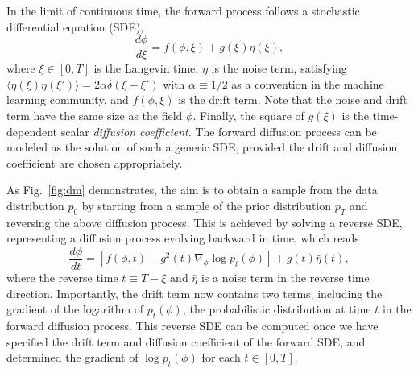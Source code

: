 In the limit of continuous time, the forward process follows a stochastic differential equation (SDE),
\begin{equation}
\frac{d \phi}{d\xi } = f(\phi, \xi) + g(\xi) \eta(\xi),
\label{eq:sde}
\end{equation}
where $\xi\in[0,T]$ is the Langevin time, $\eta$ is the noise term, satisfying {$\langle \eta(\xi)\eta(\xi')\rangle=2\alpha \delta(\xi-\xi')$ with $\alpha \equiv 1/2$ as a convention in the machine learning community}, and $f(\phi, \xi)$ is the drift term. Note that the noise and drift term have the same size as the field $\phi$. Finally, the square of $g(\xi)$ is the time-dependent scalar \textit{diffusion coefficient}. 
The forward diffusion process can be modeled as the solution of such a generic SDE, provided the drift and diffusion coefficient are chosen appropriately.

As Fig.~\ref{fig:dm} demonstrates, the aim is to obtain a sample from the data distribution $p_0$ by starting from a sample of the prior distribution $p_T$ and reversing the above diffusion process. This is achieved by solving a reverse SDE, representing a diffusion process evolving backward in time, which reads~\cite{anderson:1982reversetime}
\begin{equation}
  \frac{d\phi}{dt} = \left[ f(\phi, t) - g^2(t)\nabla_{\phi}\log p_t(\phi) \right] 
  + g(t) \bar{\eta}(t),
  \label{eq:rsde}
\end{equation}
where the reverse time $t \equiv T-\xi$ and $\bar{\eta}$ is a noise term in the reverse time direction. Importantly, the drift term now contains two terms, including the gradient of the logarithm of $p_t(\phi)$, the probabilistic distribution at time $t$ in the forward diffusion process. This reverse SDE can be computed once we have specified the drift term and diffusion coefficient of the forward SDE, and determined the gradient of $\log p_t(\phi)$ for each $t\in[0, T]$. 


